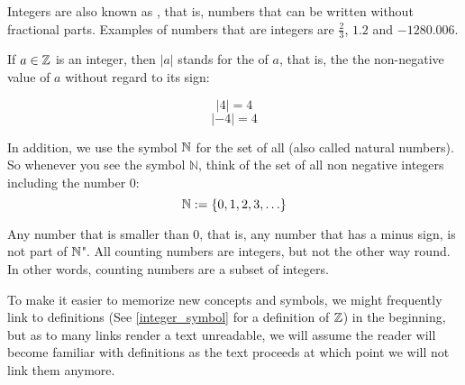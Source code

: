 Integers are also known as , that is, numbers that can be written without fractional parts. Examples of numbers that are  integers are $\frac{2}{3}$, $1.2$ and $-1280.006$.

If $a\in \mathbb{Z}$ is an integer, then $|a|$ stands for the  of $a$, that is, the the non-negative value of $a$ without regard to its sign:

\begin{equation}
|4|= 4 
\end{equation}
\begin{equation}
|-4|= 4 
\end{equation}


In addition, we use the symbol $\mathbb{N}$ for the set of all  (also called natural numbers). So whenever you see the symbol $\mathbb{N}$, think of the set of all non negative integers including the number $0$:
\begin{equation}
\label{natural_symbol}
\mathbb{N} := \{0,1,2,3,\ldots\}
\end{equation}

Any number that is smaller than 0, that is, any number that has a minus sign, is not part of $\mathbb{N}$". All counting numbers are integers, but not the other way round. In other words, counting numbers are a subset of integers.


To make it easier to memorize new concepts and symbols, we might frequently link to definitions (See \ref{integer_symbol} for a definition of $\mathbb{Z}$) in the beginning, but as to many links render a text unreadable, we will assume the reader will become familiar with definitions as the text proceeds at which point we will not link them anymore.

